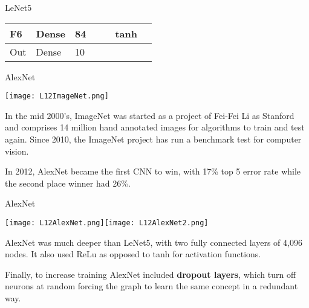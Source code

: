 \documentclass[10pt, table, dvipsnames,xcdraw, handout]{beamer}
\begin{document}
\begin{frame}[fragile]{LeNet5}
\begin{minipage}[t][0.6\textheight][t]{\textwidth}
\begin{table}[]
\begin{tabular}{|l|l|l|l|l|l|l|}
F6                           & Dense                       & 84                                                                       &                               &                               & tanh                              &                             \\ \hline
Out                          & Dense                       & 10                                                                       &                               &                               &                                   &                             \\ \hline
\end{tabular}
\end{table}

\end{minipage}
\end{frame}





\begin{frame}[fragile]{AlexNet}
  \begin{minipage}[t][0.4\textheight][t]{\textwidth}\centering
	\centering \texttt{[image: L12ImageNet.png]}
  \end{minipage}
  \vfill
\begin{minipage}[t][0.6\textheight][t]{\textwidth}
In the mid 2000's, ImageNet was started as a project of Fei-Fei Li as Stanford and comprises 14 million hand annotated images for algorithms to train and test again. Since 2010, the ImageNet project has run a benchmark test for computer vision. \pause

In 2012, AlexNet became the first CNN to win, with 17\% top 5 error rate while the second place winner had 26\%.
\end{minipage}
\end{frame}



\begin{frame}[fragile]{AlexNet}
  \begin{minipage}[t][0.4\textheight][t]{\textwidth}\centering
	\centering \texttt{[image: L12AlexNet.png]}\texttt{[image: L12AlexNet2.png]} 
  \end{minipage}
  \vfill
\begin{minipage}[t][0.6\textheight][t]{\textwidth}
AlexNet was much deeper than LeNet5, with two fully connected layers of 4,096 nodes. It also used ReLu as opposed to tanh for activation functions. \pause \newline

Finally, to increase training AlexNet included \textbf{dropout layers}, which turn off neurons at random forcing the graph to learn the same concept in a redundant way. 
\end{minipage}
\end{frame}
\end{document}
